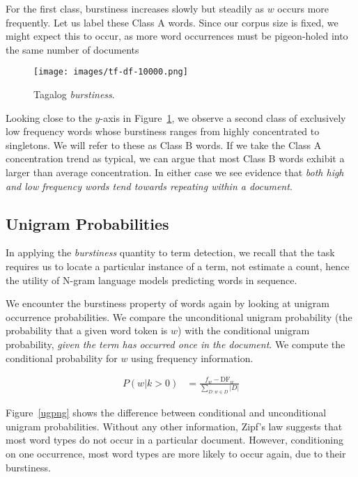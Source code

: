 \documentclass[11pt]{article}
\begin{document}
For the first class, burstiness increases slowly but steadily as $w$ occurs more frequently.  Let us label these Class A words.  Since our corpus size is fixed, we might expect this to occur, as more word occurrences must be pigeon-holed into the same number of documents  


\begin{figure}[t]
  \centering
  \texttt{[image: images/tf-df-10000.png]}
  \begin{caption}{Tagalog {\em burstiness}.}
    \label{fw-df}
  \end{caption}
\end{figure}

Looking close to the $y$-axis in Figure~\ref{fw-df}, we observe a second class of exclusively low frequency words whose burstiness ranges from highly concentrated to singletons.  We will refer to these as Class B words.  If we take the Class A concentration trend as typical, we can argue that most Class B words exhibit a larger than average concentration.  In either case we see evidence that {\em both high and low frequency words tend towards repeating within a document}.

\subsection{Unigram Probabilities}
In applying the {\em burstiness} quantity to term detection, we recall that the task requires us to locate a particular instance of a term, not estimate a count, hence the utility of N-gram language models predicting words in sequence.  

We encounter the burstiness property of words again by looking at unigram occurrence probabilities.  We compare the unconditional unigram probability (the probability that a given word token is $w$) with the conditional unigram probability, {\em given the term has occurred once in the document}.  We compute the conditional probability for $w$ using frequency information.

\begin{align}
P(w|k > 0) &= \frac{f_w-\mathrm{DF}_w}{\sum_{D: w \in D}{|D|}}
\label{unigram} 
\end{align}

Figure~\ref{ugpng} shows the difference between conditional and unconditional unigram probabilities.  Without any other information, Zipf's law suggests that most word types do not occur in a particular document.  However, conditioning on one occurrence, most word types are more likely to occur again, due to their burstiness.
\end{document}
